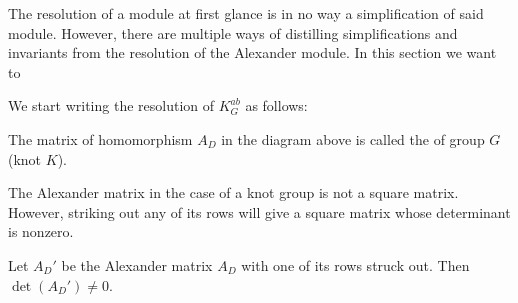 The resolution of a module at first glance is in no way a simplification of said module. However, there are multiple ways of distilling simplifications and invariants from the resolution of the Alexander module. {\color{purple}In this section we want to }

We start writing the resolution of $K_G^{ab}$ as follows:
\begin{center}
\end{center}

\begin{definition}
  The matrix of homomorphism $A_D$ in the diagram above is called the  of group $G$ (knot $K$).
\end{definition}

The Alexander matrix in the case of a knot group is not a square matrix. However, striking out any of its rows will give a square matrix whose determinant is nonzero.

\begin{proposition}\label{alexander matrix has trivial kernel}
  Let $A_D'$ be the Alexander matrix $A_D$ with one of its rows struck out. Then $\det(A_D')\neq 0$.
\end{proposition}

